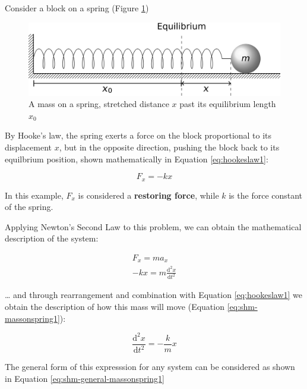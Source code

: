 \documentclass[
]{book}
\begin{document}
Consider a block on a spring (Figure \ref{fig:ch1-blockonspring1})

\begin{figure}

{\centering \includegraphics[width=0.7\linewidth]{visualisations/LaTeX/ch1-blockonspring1} 

}

\caption{A mass on a spring, stretched distance $x$ past its equilibrium length $x_0$}\label{fig:ch1-blockonspring1}
\end{figure}

By Hooke's law, the spring exerts a force on the block proportional to its displacement \(x\), but in the opposite direction, pushing the block back to its equilbrium position, shown mathematically in Equation \eqref{eq:hookeslaw1}:

\begin{equation}
F_x = -kx
\label{eq:hookeslaw1}
\end{equation}

In this example, \(F_x\) is considered a \textbf{restoring force}, while \(k\) is the force constant of the spring.

Applying Newton's Second Law to this problem, we can obtain the mathematical description of the system:

\begin{equation}
\begin{aligned}
F_x = ma_x \\
-kx = m\frac{\textrm{d}^2 x}{\textrm{d} t^2}
\end{aligned}
\end{equation}

\ldots{} and through rearrangement and combination with Equation \eqref{eq:hookeslaw1} we obtain the description of how this mass will move (Equation \eqref{eq:shm-massonspring1}):

\begin{equation}
\frac{\textrm{d}^2 x}{\textrm{d} t^2} = -\frac{k}{m}x
\label{eq:shm-massonspring1}
\end{equation}

The general form of this expresssion for any system can be considered as shown in Equation \eqref{eq:shm-general-massonspring1}
\end{document}
